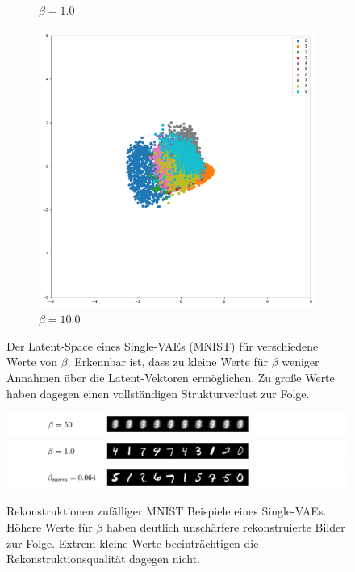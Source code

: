 \begin{figure}[H]
\begin{subfigure}{.28\textwidth}
  \caption{$\beta = 1.0$}
\end{subfigure}
\begin{subfigure}{.28\textwidth}
  \centering
  \includegraphics[width=\textwidth]{gfx/evaluation/feature_space/beta=10.0.pdf}
  \caption{$\beta = 10.0$}
\end{subfigure}
\caption{Der Latent-Space eines Single-VAEs (MNIST) für verschiedene Werte von $\beta$. Erkennbar ist, dass zu kleine Werte für $\beta$ weniger Annahmen über die Latent-Vektoren ermöglichen. Zu große Werte haben dagegen einen vollständigen Strukturverlust zur Folge.}
\label{fig:mnist_beta_influence}
\end{figure}

\begin{figure}[H]
  \centering
  \includegraphics[width=1.3\textwidth]{gfx/evaluation/feature_space/mnist_beta=50.0}
  \includegraphics[width=1.3\textwidth]{gfx/evaluation/feature_space/mnist_beta=1.0}
  \includegraphics[width=1.3\textwidth]{gfx/evaluation/feature_space/mnist_beta=norm}
  \caption{Rekonstruktionen zufälliger MNIST Beispiele eines Single-VAEs. Höhere Werte für $\beta$ haben deutlich unschärfere rekonstruierte Bilder zur Folge. Extrem kleine Werte beeinträchtigen die Rekonstruktionsqualität dagegen nicht.}
  \label{fig:mnist_recon_beta_influence}
\end{figure}

